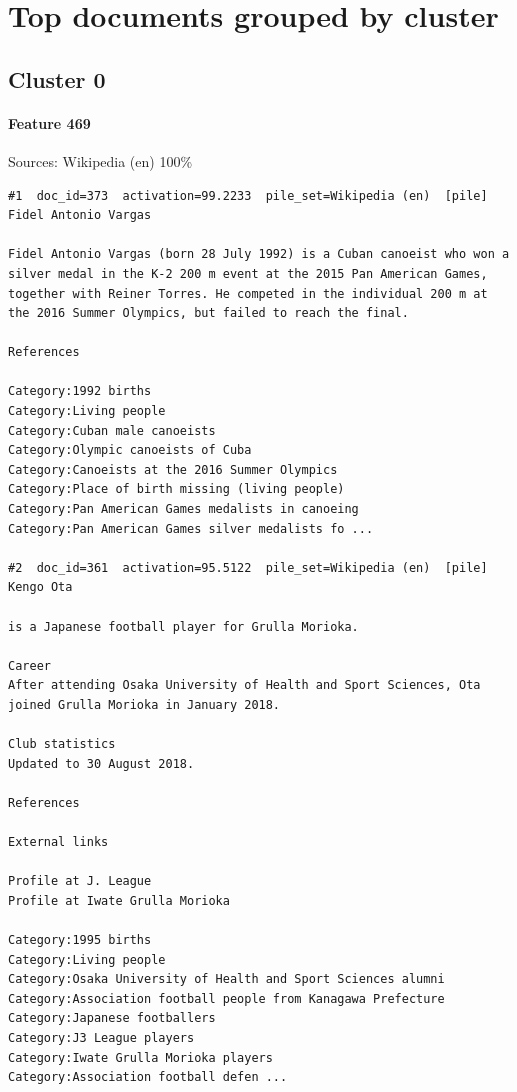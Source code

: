 \section*{Top documents grouped by cluster}

\subsection*{Cluster 0}

\paragraph*{Feature 469} Sources: Wikipedia (en) 100\%

\begin{verbatim}
#1  doc_id=373  activation=99.2233  pile_set=Wikipedia (en)  [pile]
Fidel Antonio Vargas

Fidel Antonio Vargas (born 28 July 1992) is a Cuban canoeist who won a silver medal in the K-2 200 m event at the 2015 Pan American Games, together with Reiner Torres. He competed in the individual 200 m at the 2016 Summer Olympics, but failed to reach the final.

References

Category:1992 births
Category:Living people
Category:Cuban male canoeists
Category:Olympic canoeists of Cuba
Category:Canoeists at the 2016 Summer Olympics
Category:Place of birth missing (living people)
Category:Pan American Games medalists in canoeing
Category:Pan American Games silver medalists fo ...

#2  doc_id=361  activation=95.5122  pile_set=Wikipedia (en)  [pile]
Kengo Ota

is a Japanese football player for Grulla Morioka.

Career
After attending Osaka University of Health and Sport Sciences, Ota joined Grulla Morioka in January 2018.

Club statistics
Updated to 30 August 2018.

References

External links

Profile at J. League
Profile at Iwate Grulla Morioka

Category:1995 births
Category:Living people
Category:Osaka University of Health and Sport Sciences alumni
Category:Association football people from Kanagawa Prefecture
Category:Japanese footballers
Category:J3 League players
Category:Iwate Grulla Morioka players
Category:Association football defen ...


\end{verbatim}
